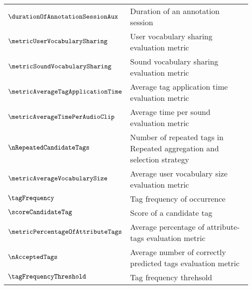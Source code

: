 \begin{longtable}{p{1.4cm}p{11.1cm}}
\\ $\durationOfAnnotationSessionAux$                & Duration of an annotation session 
\\ $\metricUserVocabularySharing$                   & User vocabulary sharing evaluation metric
\\ $\metricSoundVocabularySharing$                  & Sound vocabulary sharing evaluation metric
\\ $\metricAverageTagApplicationTime$               & Average tag application time evaluation metric
\\ $\metricAverageTimePerAudioClip$					& Average time per sound evaluation metric
\\ $\nRepeatedCandidateTags$                        & Number of repeated tags in Repeated aggregation and selection strategy
\\ $\metricAverageVocabularySize$                   & Average  user vocabulary size evaluation metric
\\ $\tagFrequency$                                  & Tag frequency of occurrence
\\ $\scoreCandidateTag$                             & Score of a candidate tag
\\ $\metricPercentageOfAttributeTags$				& Average percentage of attribute-tags evaluation metric
\\ $\nAcceptedTags$                                 & Average number of correctly predicted tags evaluation metric
\\ $\tagFrequencyThreshold$                         & Tag frequency threhsold
\end{longtable}

\vfill
